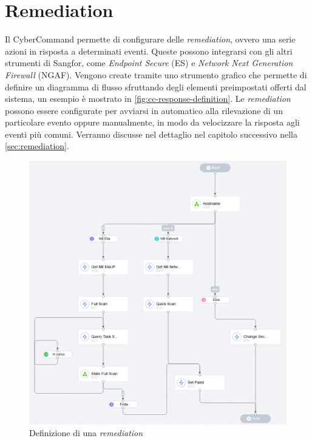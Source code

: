 \section{Remediation}

Il CyberCommand permette di configurare delle \emph{remediation}, ovvero una serie azioni in risposta a determinati eventi. Queste possono integrarsi con gli altri strumenti di Sangfor, come \emph{Endpoint Secure} (ES) e \emph{Network Next Generation Firewall} (NGAF). Vengono create tramite uno strumento grafico che permette di definire un diagramma di flusso sfruttando degli elementi preimpostati offerti dal sistema, un esempio è mostrato in \autoref{fig:cc-response-definition}. Le \emph{remediation} possono essere configurate per avviarsi in automatico alla rilevazione di un particolare evento oppure manualmente, in modo da velocizzare la risposta agli eventi più comuni. Verranno discusse nel dettaglio nel capitolo successivo nella \autoref{sec:remediation}.

\begin{figure}[!htbp]
    \centering
    \includegraphics[width=\linewidth]{images/ndr/response.png}
    \caption{Definizione di una \emph{remediation}}
    \label{fig:cc-response-definition}
\end{figure}

